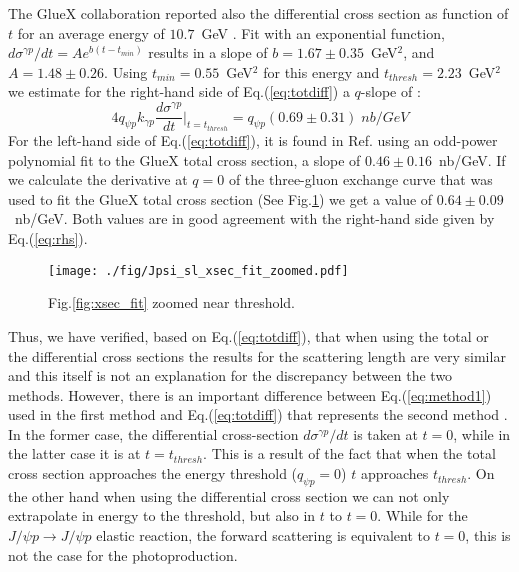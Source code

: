 \documentclass[%
preprint,
nofootinbib,
 amsmath,amssymb,
 aps,
floatfix,
]{revtex4-1}
\begin{document}
The GlueX collaboration reported also the differential cross section
as function of $t$ for an average energy of $10.7$~GeV \cite{prl_gluex}. 
Fit with an exponential function,
$d\sigma^{\gamma p}/dt = Ae^{b(t-t_{min})}$ 
results in a slope of $b=1.67 \pm 0.35$~GeV$^2$, and $A=1.48 \pm 0.26$.
Using $t_{min}=0.55$~GeV$^2$ for this energy and $t_{thresh} = 2.23$~GeV$^2$ 
we estimate for the right-hand side of Eq.(\ref{eq:totdiff}) a $q$-slope of :
\begin{equation}
4q_{\psi p}k_{\gamma p}\frac{d\sigma^{\gamma p}}{dt}\Big |_{t=t_{thresh}} =
q_{\psi p} (0.69\pm0.31)\;nb/GeV
\label{eq:rhs}
\end{equation}
For the left-hand side of Eq.(\ref{eq:totdiff}), 
it is found in Ref.\cite{Strakovsky_jpsi} using an odd-power 
polynomial fit to the GlueX total cross section,
a slope of $0.46 \pm 0.16$~nb/GeV. 
If we calculate the derivative at $q=0$ of the three-gluon exchange curve
that was used to fit the GlueX total cross section (See Fig.\ref{fig:xsec_zoom})
we get a value of $0.64\pm0.09$~nb/GeV. 
Both values are in good agreement with the right-hand side given by Eq.(\ref{eq:rhs}).
%
\begin{figure}
    \texttt{[image: ./fig/Jpsi\_sl\_xsec\_fit\_zoomed.pdf]}
    \caption{Fig.\ref{fig:xsec_fit} zoomed near threshold.}
    \label{fig:xsec_zoom}
\end{figure}

Thus, we have verified, based on Eq.(\ref{eq:totdiff}),
that when using the total or the differential cross sections
the results for the scattering length are very similar
and this itself is not an explanation for the discrepancy between the two methods.
However, there is an important difference between 
Eq.(\ref{eq:method1}) used in the first method \cite{Vanderhaeghen_jpsi} and
Eq.(\ref{eq:totdiff}) that represents the second method \cite{Strakovsky_jpsi}. 
In the former case, the differential cross-section $d\sigma^{\gamma p}/dt$
is taken at $t=0$, while in the latter case it is at $t=t_{thresh}$.
This is a result of the fact that when the total cross section approaches 
the energy threshold ($q_{\psi p}=0$) $t$ approaches $t_{thresh}$. 
On the other hand when using the differential cross section we can
not only extrapolate in energy to the threshold, but also in $t$ to $t=0$.
While for the $J/\psi p \to J/\psi p$ elastic reaction,
the forward scattering is equivalent to $t=0$, this is not the case for the photoproduction.
\end{document}
